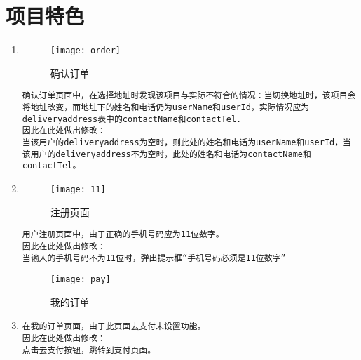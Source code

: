 
\chapter{项目特色}
\begin{enumerate}
\item
\begin{figure}[htbp]
    \centering
    \texttt{[image: order]}
    \caption{确认订单}\label{fig:ord}
    \vspace{\baselineskip}
    \end{figure}

\begin{verbatim}
确认订单页面中，在选择地址时发现该项目与实际不符合的情况：当切换地址时，该项目会将地址改变，而地址下的姓名和电话仍为userName和userId，实际情况应为deliveryaddress表中的contactName和contactTel.
因此在此处做出修改：
当该用户的deliveryaddress为空时，则此处的姓名和电话为userName和userId，当该用户的deliveryaddress不为空时，此处的姓名和电话为contactName和contactTel。
\end{verbatim}    

\item
\begin{figure}[htbp]
    \centering
    \texttt{[image: 11]}
    \caption{注册页面}\label{fig:xml}
    \vspace{\baselineskip}
    \end{figure}

\begin{verbatim}
用户注册页面中，由于正确的手机号码应为11位数字。
因此在此处做出修改：
当输入的手机号码不为11位时，弹出提示框“手机号码必须是11位数字”    
\end{verbatim}

\begin{figure}[htbp]
\centering
\texttt{[image: pay]}
\caption{我的订单}\label{fig:xml}
\vspace{\baselineskip}
\end{figure}

\item
\begin{verbatim}
在我的订单页面，由于此页面去支付未设置功能。
因此在此处做出修改：
点击去支付按钮，跳转到支付页面。
      
\end{verbatim}


\end{enumerate}